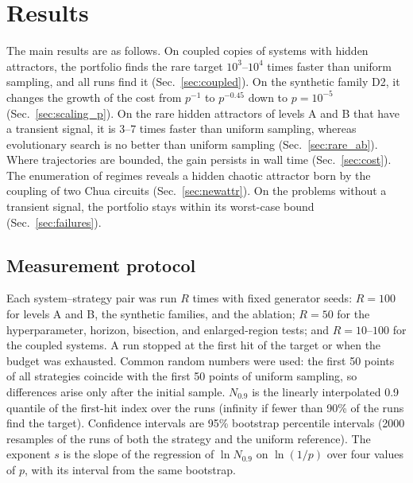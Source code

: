 \section{Results}\label{sec:results}

The main results are as follows. On coupled copies of systems with hidden attractors, the portfolio finds the rare target $10^3$--$10^4$ times faster than uniform sampling, and all runs find it (Sec.~\ref{sec:coupled}). On the synthetic family D2, it changes the growth of the cost from $p^{-1}$ to $p^{-0.45}$ down to $p=10^{-5}$ (Sec.~\ref{sec:scaling_p}). On the rare hidden attractors of levels A and B that have a transient signal, it is 3--7 times faster than uniform sampling, whereas evolutionary search is no better than uniform sampling (Sec.~\ref{sec:rare_ab}). Where trajectories are bounded, the gain persists in wall time (Sec.~\ref{sec:cost}). The enumeration of regimes reveals a hidden chaotic attractor born by the coupling of two Chua circuits (Sec.~\ref{sec:newattr}). On the problems without a transient signal, the portfolio stays within its worst-case bound (Sec.~\ref{sec:failures}).

\subsection{Measurement protocol}\label{sec:measure}

Each system--strategy pair was run $R$ times with fixed generator seeds: $R=100$ for levels A and B, the synthetic families, and the ablation; $R=50$ for the hyperparameter, horizon, bisection, and enlarged-region tests; and $R=10$--$100$ for the coupled systems. A run stopped at the first hit of the target or when the budget was exhausted. Common random numbers were used: the first 50 points of all strategies coincide with the first 50 points of uniform sampling, so differences arise only after the initial sample. $N_{0.9}$ is the linearly interpolated 0.9 quantile of the first-hit index over the runs (infinity if fewer than 90\% of the runs find the target). Confidence intervals are 95\% bootstrap percentile intervals\cite{EfronTibshirani1994} (2000 resamples of the runs of both the strategy and the uniform reference). The exponent $s$ is the slope of the regression of $\ln N_{0.9}$ on $\ln(1/p)$ over four values of $p$, with its interval from the same bootstrap.

